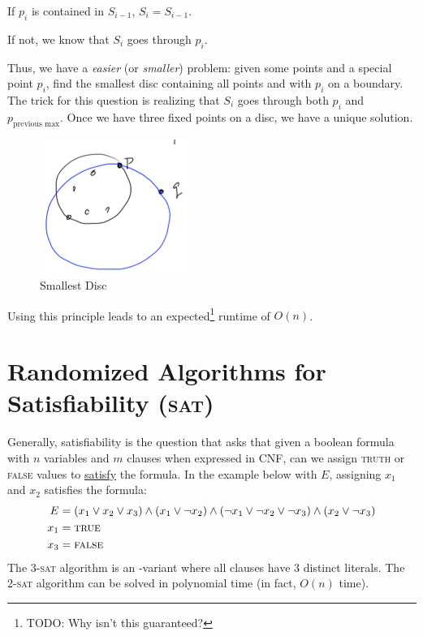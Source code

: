                 If $p_i$ is contained in $S_{i-1}$, $S_i = S_{i-1}$.

                If not, we know that $S_i$ goes through $p_i$.

                Thus, we have a \textit{easier} (or \textit{smaller}) problem: given some points and a special point $p_i$, find the smallest disc containing all points and with $p_i$ on a boundary.
                The trick for this question is realizing that $S_i$ goes through both $p_i$ and $p_{\text{previous max}}$.
                Once we have three fixed points on a disc, we have a unique solution.
                \begin{figure}[h]
                    \centering
                    \includegraphics{images/smallest_disc.png}
                    \caption{Smallest Disc}
                    \label{fig:smallest_disc}
                \end{figure}
                Using this principle leads to an expected\footnote{TODO: Why isn't this guaranteed?} runtime of $O(n)$.
        \chapter{Randomized Algorithms for Satisfiability (\textsc{sat})} %
        \label{cha:randomized_algorithms_for_satisfiability_}
            Generally, satisfiability is the question that asks that given a boolean formula with $n$ variables and $m$ clauses when expressed in CNF, can we assign \textsc{truth} or \textsc{false} values to \uline{satisfy} the formula.
            In the example below with $E$, assigning $x_1$ and $x_2$ satisfies the formula:
            \begin{align*}
                E &= (x_1 \lor x_2 \lor x_3) \land (x_1 \lor \lnot x_2) \land (\lnot x_1 \lor \lnot x_2 \lor \lnot x_3) \land (x_2 \lor \lnot x_3) \\
                x_1 &= \text{\textsc{true}} \\
                x_3 &= \text{\textsc{false}}
            \end{align*}
            The \textsc{3-sat} algorithm is an \np-variant where all clauses have $3$ distinct literals.
            The \textsc{2-sat} algorithm can be solved in polynomial time (in fact, $O(n)$ time).

